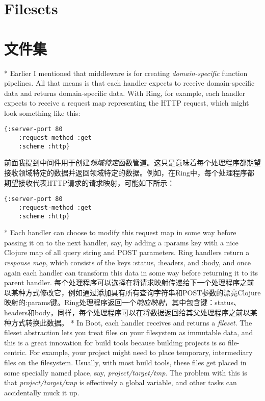 \begin{paracol}{2}
\section{Filesets}
\switchcolumn
\section{文件集}
\switchcolumn[0]*
Earlier I mentioned that middleware is for creating
\emph{domain-specific} function pipelines. All that means is that each
handler expects to receive domain-specific data and returns
domain-specific data. With Ring, for example, each handler expects to
receive a request map representing the HTTP request, which might look
something like this:
\begin{verbatim}
{:server-port 80
    :request-method :get
    :scheme :http}
\end{verbatim}
\switchcolumn
前面我提到中间件用于创建\emph{领域特定}函数管道。这只是意味着每个处理程序都期望接收领域特定的数据并返回领域特定的数据。例如，在Ring中，每个处理程序都期望接收代表HTTP请求的请求映射，可能如下所示：
\begin{verbatim}
{:server-port 80
    :request-method :get
    :scheme :http}
\end{verbatim}
\switchcolumn[0]*
Each handler can choose to modify this request map in some way before
passing it on to the next handler, say, by adding a :params key with a
nice Clojure map of all query string and POST parameters. Ring handlers
return a \emph{response map}, which consists of the keys :status,
:headers, and :body, and once again each handler can transform this data
in some way before returning it to its parent handler.
\switchcolumn
每个处理程序可以选择在将请求映射传递给下一个处理程序之前以某种方式修改它，例如通过添加具有所有查询字符串和POST参数的漂亮Clojure映射的:params键。Ring处理程序返回一个\emph{响应映射}，其中包含键：status、headers和body，同样，每个处理程序可以在将数据返回给其父处理程序之前以某种方式转换此数据。
\switchcolumn[0]*
In Boot, each handler receives and returns a \emph{fileset}. The fileset
abstraction lets you treat files on your filesystem as immutable data,
and this is a great innovation for build tools because building projects
is so file-centric. For example, your project might need to place
temporary, intermediary files on the filesystem. Usually, with most
build tools, these files get placed in some specially named place, say,
\emph{project/target/tmp}. The problem with this is that
\emph{project/target/tmp} is effectively a global variable, and other
tasks can accidentally muck it up.

\end{paracol}
